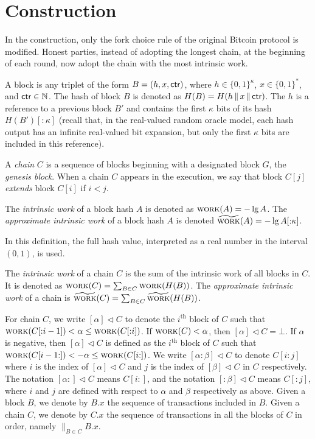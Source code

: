 \section{Construction}
In the \poem construction, only the fork choice rule
of the original Bitcoin protocol is modified.
Honest parties, instead of adopting the longest chain, at the beginning
of each round, now adopt the chain with the most intrinsic work.

A block is any triplet of the
form $B = (h, x, \textsf{ctr})$, where $h \in \{0,1\}^\kappa$, $x \in \{0, 1\}^*$, and $\textsf{ctr} \in \mathbb{N}$.
The hash of block $B$ is denoted as $H(B) = H(h \,\|\, x \,\|\, \textsf{ctr})$.
The $h$ is a reference to a previous block $B'$ and
contains the first $\kappa$ bits of its hash $H(B')[{:}{\kappa}]$
(recall that, in the real-valued random oracle model, each hash
output has an infinite real-valued bit expansion, but only the first
$\kappa$ bits are included in this reference).

A \emph{chain} $C$ is a sequence of blocks beginning with a designated
block $G$, the \emph{genesis block}. When a chain $C$ appears in the execution,
we say that block $C[j]$ \emph{extends} block $C[i]$ if $i < j$.

\begin{definition}
  The \emph{intrinsic work} of a block hash
  $A$ is denoted as $\textsc{work}(A) = -\lg A$.
  The \emph{approximate intrinsic work} of a block hash $A$ is denoted
  $\widetilde{\textsc{work}}(A) = -\lg A[{:}{\kappa}]$.
\end{definition}

In this definition, the full hash value, interpreted as a real number in the interval
$(0, 1)$, is used.

\begin{definition}
  The \emph{intrinsic work} of a chain
  $C$ is the sum of the
  intrinsic work of all blocks in $C$.
  It is denoted as $\textsc{work}(C) = \sum_{B \in C}{\textsc{work}(H(B))}$.
  The \emph{approximate intrinsic work} of a chain
  is $\widetilde{\textsc{work}}(C) = \sum_{B \in C}{\widetilde{\textsc{work}}(H(B))}$.
\end{definition}

\noindent
{}
For chain $C$, we write $[\alpha] \lhd C$
to denote the $i^\text{th}$ block of $C$ such that
$\textsc{work}(C[{:}{i - 1}]) < \alpha \leq \textsc{work}(C[{:}{i}])$.
If $\textsc{work}(C) < \alpha$, then $[\alpha] \lhd C = \bot$.
If $\alpha$ is negative, then $[\alpha] \lhd C$ is defined as
the $i^\text{th}$ block of $C$ such that
$\textsc{work}(C[{i - 1}{:}]) < -\alpha \leq \textsc{work}(C[{i}{:}])$.
We write $[{\alpha}{:}{\beta}] \lhd C$ to denote
$C[{i}{:}{j}]$ where $i$ is the index of $[\alpha] \lhd C$
and $j$ is the index of $[\beta] \lhd C$ in $C$ respectively.
The notation $[{\alpha}{:}] \lhd C$ means $C[{i}{:}]$,
and the notation $[{:}\beta] \lhd C$ means $C[{:}{j}]$,
where $i$ and $j$ are defined with respect to $\alpha$ and $\beta$
respectively as above.
Given a block $B$, we denote by $B.x$ the sequence of transactions
included in $B$.
Given a chain $C$, we denote by $C.x$
the sequence of transactions in all the blocks of $C$ in order, namely
${\big\lVert}_{B \in C} B.x$.

